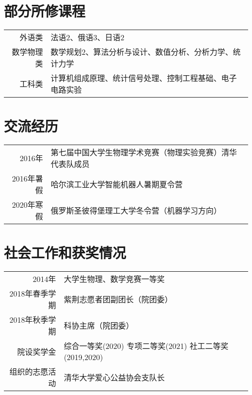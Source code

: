 \documentclass[12pt,colorlinks,linkcolor=true]{moderncv}
\begin{document}
\section{部分所修课程}
\begin{tabular}{rl}
    外语类 & 法语2、俄语3、日语2 \\
    数学物理类 & 数学规划2、算法分析与设计、数值分析、分析力学、统计力学\\
    工科类 & 计算机组成原理、统计信号处理、控制工程基础、电子电路实验
\end{tabular}
\section{交流经历}
\begin{tabular}{rl}
    2016年 & 第七届中国大学生物理学术竞赛（物理实验竞赛）清华代表队成员\\
    2016年暑假 & 哈尔滨工业大学智能机器人暑期夏令营 \\
    2020年寒假 & 俄罗斯圣彼得堡理工大学冬令营（机器学习方向）
\end{tabular}

\section{社会工作和获奖情况}

\begin{tabular}{rl}
2014年 & 大学生物理、数学竞赛一等奖 \\
2018年春季学期  & 紫荆志愿者团副团长（院团委）\\
2018年秋季学期 & 科协主席（院团委） \\
院设奖学金 & 综合一等奖(2020) 专项二等奖(2021) 社工二等奖 (2019,2020)\\
组织的志愿活动 & 清华大学爱心公益协会支队长
\end{tabular}
\end{document}
